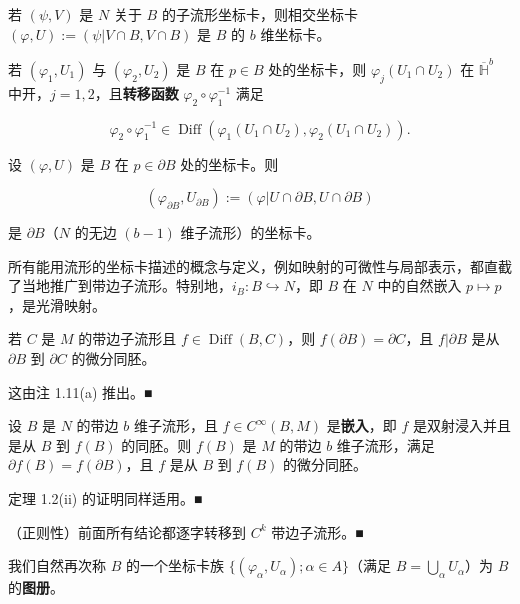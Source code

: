 \begin{remark}

\begin{items}
\item

若 $ (\psi,V) $ 是 $ N $ 关于 $ B $ 的子流形坐标卡，则相交坐标卡 $ (\varphi,U) := (\psi|V\cap B, V\cap B) $ 是 $ B $ 的 $ b $ 维坐标卡。

\item

若 $ (\varphi_1,U_1) $ 与 $ (\varphi_2,U_2) $ 是 $ B $ 在 $ p \in B $ 处的坐标卡，则 $ \varphi_j(U_1\cap U_2) $ 在 $ \overline{\mathbb{H}}^b $ 中开，$ j = 1,2 $，且\textbf{转移函数} $ \varphi_2\circ\varphi_1^{-1} $ 满足

\[
\varphi_2\circ\varphi_1^{-1} \in \operatorname{Diff}(\varphi_1(U_1\cap U_2), \varphi_2(U_1\cap U_2)) .
\]
\item

设 $ (\varphi,U) $ 是 $ B $ 在 $ p \in \partial B $ 处的坐标卡。则

\[
(\varphi_{\partial B}, U_{\partial B}) := (\varphi|U\cap\partial B, U\cap\partial B)
\]

是 $ \partial B $（$ N $ 的无边 $ (b-1) $ 维子流形）的坐标卡。

\item

所有能用流形的坐标卡描述的概念与定义，例如映射的可微性与局部表示，都直截了当地推广到带边子流形。特别地，$ i_B : B \hookrightarrow N $，即 $ B $ 在 $ N $ 中的自然嵌入 $ p \mapsto p $，是光滑映射。

\item

若 $ C $ 是 $ M $ 的带边子流形且 $ f \in \operatorname{Diff}(B,C) $，则 $ f(\partial B) = \partial C $，且 $ f|\partial B $ 是从 $ \partial B $ 到 $ \partial C $ 的微分同胚。

\proofhead
这由注 1.11(a) 推出。\nobreak\hspace{0.35em}■
\item

设 $ B $ 是 $ N $ 的带边 $ b $ 维子流形，且 $ f \in C^{\infty}(B,M) $ 是\textbf{嵌入}，即 $ f $ 是双射浸入并且是从 $ B $ 到 $ f(B) $ 的同胚。则 $ f(B) $ 是 $ M $ 的带边 $ b $ 维子流形，满足 $ \partial f(B) = f(\partial B) $，且 $ f $ 是从 $ B $ 到 $ f(B) $ 的微分同胚。

\proofhead
定理 1.2(ii) 的证明同样适用。\nobreak\hspace{0.35em}■
\item

（正则性）前面所有结论都逐字转移到 $ C^k $ 带边子流形。\nobreak\hspace{0.35em}■

\end{items}

我们自然再次称 $ B $ 的一个坐标卡族 $ \{(\varphi_{\alpha},U_{\alpha}) ; \alpha \in A\} $（满足 $ B = \bigcup_{\alpha}U_{\alpha} $）为 $ B $ 的\textbf{图册}。

\end{remark}

